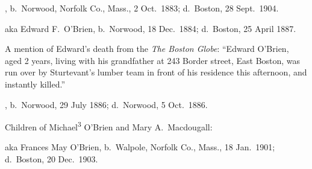 \begin{Kids}
	
	, b.\ Norwood, Norfolk Co., Mass., 2 Oct.\ 1883;\cite{Arthur4OBrienBirth} d.\ Boston, 28 Sept.\ 1904.\cite{Arthur4OBrienDeath}
	
	 aka Edward F.\ O'Brien, b.\ Norwood, 18 Dec.\ 1884;\cite{Edward4OBrienBirth} d.\ Boston, 25 April 1887.\cite{Edward4OBrienDeath}
	
	\begin{KidsMoreText}
		A mention of Edward's death from the \textit{The Boston Globe}: ``Edward O'Brien, aged 2 years, living with his grandfather at 243 Border street, East Boston, was run over by Sturtevant's lumber team in front of his residence this afternoon, and instantly killed.''\cite{Edward4OBrienDeath2}
	\end{KidsMoreText}
	
	, b.\ Norwood, 29 July 1886;\cite{Elizabeth4OBrienBirth} d.\ Norwood, 5 Oct.\ 1886.\cite{Elizabeth4OBrienDeath}
	
\end{Kids}

\begin{KidsIntro}
	Children of Michael\textsuperscript{3} O'Brien and Mary A.\ Macdougall:
\end{KidsIntro}

\begin{Kids}
	 aka Frances May O'Brien, b.\ Walpole, Norfolk Co., Mass., 18 Jan.\ 1901;\cite{Frances4OBrienBirth} d.\ Boston, 20 Dec.\ 1903.\cite{Frances4OBrienDeath}
\end{Kids}